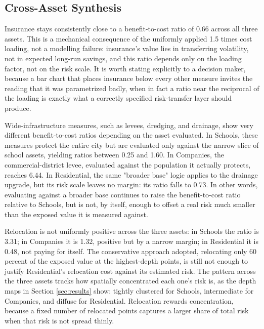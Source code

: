 \documentclass[11pt]{article}
\begin{document}
\subsection{Cross-Asset Synthesis}
\label{sec:synthesis}

Insurance stays consistently close to a benefit-to-cost ratio of 0.66 across all three
assets. This is a mechanical consequence of the uniformly applied 1.5 times cost loading,
not a modelling failure: insurance's value lies in transferring volatility, not in expected
long-run savings, and this ratio depends only on the loading factor, not on the risk scale.
It is worth stating explicitly to a decision maker, because a bar chart that places
insurance below every other measure invites the reading that it was parametrized badly, when
in fact a ratio near the reciprocal of the loading is exactly what a correctly specified
risk-transfer layer should produce.

Wide-infrastructure measures, such as levees, dredging, and drainage, show very different
benefit-to-cost ratios depending on the asset evaluated. In Schools, these measures protect
the entire city but are evaluated only against the narrow slice of school assets, yielding
ratios between 0.25 and 1.60. In Companies, the commercial-district levee, evaluated against
the population it actually protects, reaches 6.44. In Residential, the same "broader base"
logic applies to the drainage upgrade, but its risk scale leaves no margin: its ratio falls
to 0.73. In other words, evaluating against a broader base continues to raise the
benefit-to-cost ratio relative to Schools, but is not, by itself, enough to offset a real
risk much smaller than the exposed value it is measured against.

Relocation is not uniformly positive across the three assets: in Schools the ratio is 3.31;
in Companies it is 1.32, positive but by a narrow margin; in Residential it is 0.48, not
paying for itself. The conservative approach adopted, relocating only 60 percent of the
exposed value at the highest-depth points, is still not enough to justify Residential's
relocation cost against its estimated risk. The pattern across the three assets tracks how
spatially concentrated each one's risk is, as the depth maps in Section \ref{sec:results}
show: tightly clustered for Schools, intermediate for Companies, and diffuse for
Residential. Relocation rewards concentration, because a fixed number of relocated points
captures a larger share of total risk when that risk is not spread thinly.
\end{document}
